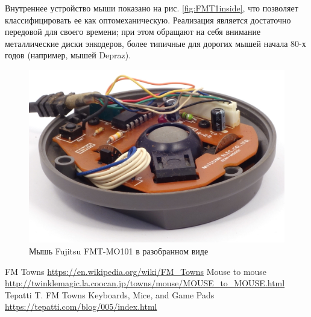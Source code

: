 \documentclass[11pt, a4paper]{article}
\begin{document}
Внутреннее устройство мыши показано на рис. \ref{fig:FMT1inside}, что позволяет классифицировать  ее как оптомеханическую. Реализация является достаточно передовой для своего времени; при этом обращают на себя внимание металлические диски энкодеров, более типичные для дорогих мышей начала 80-х годов (например, мышей Depraz).

\begin{figure}[h]
    \centering
    \includegraphics[scale=0.8]{1989_fujitsu_fmt_mo101_mouse/inside_30.jpg}
    \caption{Мышь Fujitsu FMT-MO101 в разобранном виде}
    \label{fig:FMT1Inside}
\end{figure}

\begin{thebibliography}{9}
     FM Towns \url{https://en.wikipedia.org/wiki/FM_Towns}
     Mouse to mouse \url{http://twinklemagic.la.coocan.jp/towns/mouse/MOUSE_to_MOUSE.html} 
     Tepatti T. FM Towns Keyboards, Mice, and Game Pads \url{https://tepatti.com/blog/005/index.html}
\end{thebibliography}
\end{document}
